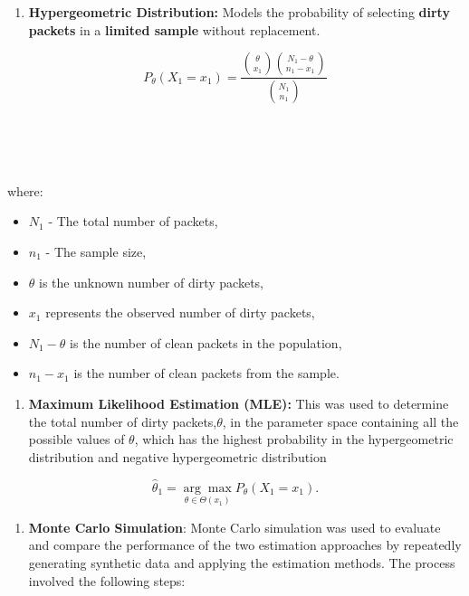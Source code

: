 \documentclass[
  14pt,
]{article}
\providecommand{\tightlist}{%
  \setlength{\itemsep}{0pt}\setlength{\parskip}{0pt}}
\begin{document}
\begin{enumerate}
\def\labelenumi{(\arabic{enumi})}
\tightlist
\item
  \textbf{Hypergeometric Distribution:} Models the probability of
  selecting \textbf{dirty packets} in a \textbf{limited sample} without
  replacement.
\end{enumerate}

\[
P_{\theta}(X_1 = x_1) = \frac{\binom{\theta}{x_1} \binom{N_1 - \theta}{n_1 - x_1}}{\binom{N_1}{n_1}}
\] ~\\
\strut \\
\strut \\
where:

\begin{itemize}
\tightlist
\item
  \(N_1\) - The total number of packets,
\item
  \(n_1\) - The sample size,
\item
  \(\theta\) is the unknown number of dirty packets,
\item
  \(x_1\) represents the observed number of dirty packets,
\item
  \(N_1 - \theta\) is the number of clean packets in the population,
\item
  \(n_1 - x_1\) is the number of clean packets from the sample.\\
\end{itemize}

\begin{enumerate}
\def\labelenumi{(\arabic{enumi})}
\setcounter{enumi}{1}
\tightlist
\item
  \textbf{Maximum Likelihood Estimation (MLE):} This was used to
  determine the total number of dirty packets,\textbf{\(\theta\)}, in
  the parameter space containing all the possible values of
  \textbf{\(\theta\)}, which has the highest probability in the
  hypergeometric distribution and negative hypergeometric distribution
\end{enumerate}

\[
\hat{\theta}_1 = \underset{\theta \in \Theta(x_1)}{\arg\max} P_{\theta}(X_1 = x_1).
\]

\hfill\break
\hfill\break
\hfill\break

\begin{enumerate}
\def\labelenumi{(\arabic{enumi})}
\setcounter{enumi}{2}
\tightlist
\item
  \textbf{Monte Carlo Simulation}: Monte Carlo simulation was used to
  evaluate and compare the performance of the two estimation approaches
  by repeatedly generating synthetic data and applying the estimation
  methods. The process involved the following steps:
\end{enumerate}
\end{document}

